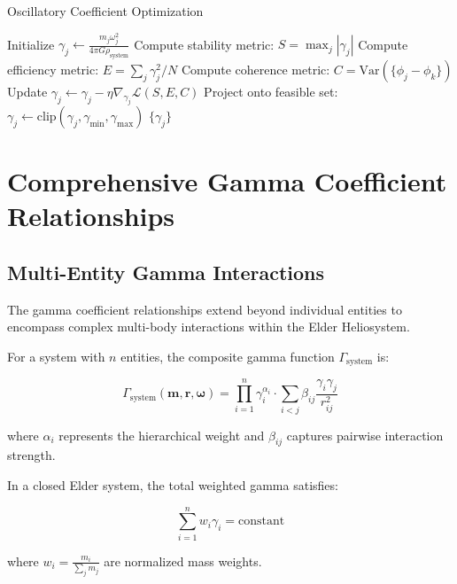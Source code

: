 \begin{algorithm}
\caption{Oscillatory Coefficient Optimization}
\begin{algorithmic}[1]
    \State Initialize $\gamma_j \gets \frac{m_j \omega_j^2}{4\pi G \rho_{\text{system}}}$
        \State Compute stability metric: $S = \max_j |\gamma_j|$
        \State Compute efficiency metric: $E = \sum_j \gamma_j^2 / N$
        \State Compute coherence metric: $C = \text{Var}(\{\phi_j - \phi_k\})$
        \State Update $\gamma_j \gets \gamma_j - \eta \nabla_{\gamma_j} \mathcal{L}(S, E, C)$
        \State Project onto feasible set: $\gamma_j \gets \text{clip}(\gamma_j, \gamma_{\min}, \gamma_{\max})$
    \EndWhile
    \State \Return $\{\gamma_j\}$
\EndFunction
\end{algorithmic}
\end{algorithm}

\section{Comprehensive Gamma Coefficient Relationships}

\subsection{Multi-Entity Gamma Interactions}

The gamma coefficient relationships extend beyond individual entities to encompass complex multi-body interactions within the Elder Heliosystem.

\begin{definition}
For a system with $n$ entities, the composite gamma function $\Gamma_{\text{system}}$ is:

\begin{equation}
\Gamma_{\text{system}}(\mathbf{m}, \mathbf{r}, \mathbf{\omega}) = \prod_{i=1}^n \gamma_i^{\alpha_i} \cdot \sum_{i<j} \beta_{ij} \frac{\gamma_i \gamma_j}{r_{ij}^2}
\end{equation}

where $\alpha_i$ represents the hierarchical weight and $\beta_{ij}$ captures pairwise interaction strength.
\end{definition}

\begin{theorem}
In a closed Elder system, the total weighted gamma satisfies:

\begin{equation}
\sum_{i=1}^n w_i \gamma_i = \text{constant}
\end{equation}

where $w_i = \frac{m_i}{\sum_j m_j}$ are normalized mass weights.
\end{theorem}


